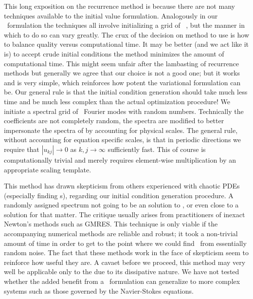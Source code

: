 This long exposition on the recurrence method is
because there are not many techniques available
to the initial value formulation. Analogously
in our \spt\
formulation the techniques all involve
initializing a grid of \spt\ \Fcs, but
the manner in which to do so can vary greatly.
The crux of the decision on method to use
is how to balance quality
versus computational time.
It may be better (and we act like it is)
to accept crude initial conditions
the method minimizes the amount of computational time.
This might seem unfair after the
lambasting of recurrence methods but generally we agree that
our choice is not a good one; but it works and is very simple,
which reinforces how potent the variational formulation can be.
Our general rule is that
the initial condition generation should take much less time
and be much less complex than the actual optimization procedure!
We initiate a spectral grid of \spt\ Fourier modes
with random numbers. Technically the
coefficients are not completely random,
the spectra are modified to better impersonate
the spectra of \twots by accounting for
physical scales.
The general rule, without accounting for
equation specific scales, is that in
periodic directions we require that
$|u_{kj} |\to 0$ as $k,j \to \infty$ sufficiently fast.
This of course
is computationally trivial and merely
requires element-wise multiplication by
an appropriate scaling template.

This method has drawn skepticism
from others experienced
with chaotic PDEs (especially finding {\po}s),
regarding our initial condition generation procedure.
A randomly assigned spectrum
not going to be an solution to ,
or even close to a solution for that matter.
The critique usually arises from practitioners
of inexact Newton's methods such as GMRES.
This technique is only viable if the
accompanying numerical methods are reliable and robust; it took
a non-trivial amount of time in order to get to
the point where we could find \twots\ from essentially random noise.
The fact that these methods work in the face of skepticism
seem to reinforce how useful they are.
A cavaet before we proceed,
this method may very well be applicable only to the \KSe due to its
dissipative nature. We have not tested whether the added benefit
from a \spt\ formulation can generalize to more complex
systems such as those governed by the Navier-Stokes equations.


